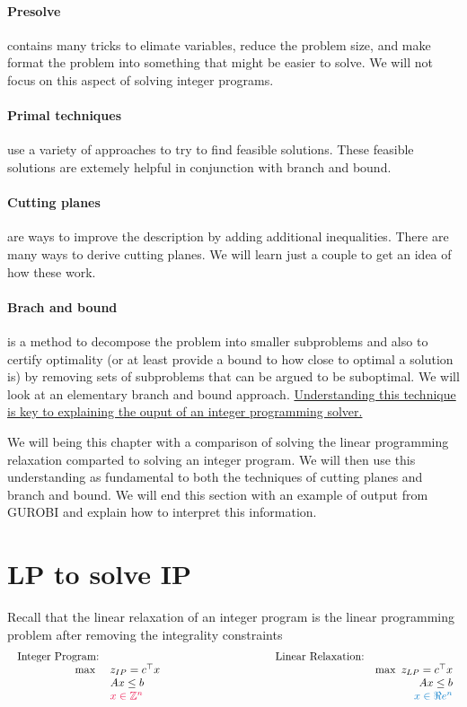 \paragraph{Presolve} contains many tricks to elimate variables, reduce the problem size, and make format the problem into something that might be easier to solve.  We will not focus on this aspect of solving integer programs.

\paragraph{Primal techniques} use a variety of approaches to try to find feasible solutions.  These feasible solutions are extemely helpful in conjunction with branch and bound.

\paragraph{Cutting planes} are ways to improve the description by adding additional inequalities.  There are many ways to derive cutting planes.  We will learn just a couple to get an idea of how these work.  

\paragraph{Brach and bound} is a method to decompose the problem into smaller subproblems and also to certify optimality (or at least provide a bound to how close to optimal a solution is) by removing sets of subproblems that can be argued to be suboptimal.   We will look at an elementary branch and bound approach.  \underline{Understanding this technique is key to explaining the ouput of an integer programming solver.}


We will being this chapter with a comparison of solving the linear programming relaxation comparted to solving an integer program.  We will then use this understanding as fundamental to both the techniques of cutting planes and branch and bound.
We will end this section with an example of output from GUROBI and explain how to interpret this information.

\section{LP to solve IP}

Recall that the linear relaxation of an integer program is the linear programming problem after removing the integrality constraints
$$
\begin{array}{rlclr}
\text{ Integer Program:} & & & \text{Linear Relaxation:}\\
\max \ & z_{IP} = c^\top x & \hspace{3cm} & & \max \  z_{LP} = c^\top x \\
& Ax \leq b & & & Ax \leq b\\
& \tred{x \in \Z^n} & & & \tblue{x \in \R^n}
\end{array}
$$

